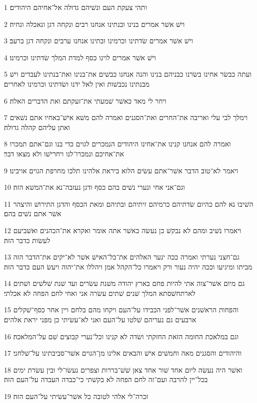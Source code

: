 \par 1 ותהי צעקת העם ונשׁיהם גדולה אל־אחיהם היהודים׃
\par 2 וישׁ אשׁר אמרים בנינו ובנתינו אנחנו רבים ונקחה דגן ונאכלה ונחיה׃
\par 3 וישׁ אשׁר אמרים שׂדתינו וכרמינו ובתינו אנחנו ערבים ונקחה דגן ברעב׃
\par 4 וישׁ אשׁר אמרים לוינו כסף למדת המלך שׂדתינו וכרמינו׃
\par 5 ועתה כבשׂר אחינו בשׂרנו כבניהם בנינו והנה אנחנו כבשׁים את־בנינו ואת־בנתינו לעבדים וישׁ מבנתינו נכבשׁות ואין לאל ידנו ושׂדתינו וכרמינו לאחרים׃
\par 6 ויחר לי מאד כאשׁר שׁמעתי את־זעקתם ואת הדברים האלה׃
\par 7 וימלך לבי עלי ואריבה את־החרים ואת־הסגנים ואמרה להם משׁא אישׁ־באחיו אתם נשׁאים ואתן עליהם קהלה גדולה׃
\par 8 ואמרה להם אנחנו קנינו את־אחינו היהודים הנמכרים לגוים כדי בנו וגם־אתם תמכרו את־אחיכם ונמכרו־לנו ויחרישׁו ולא מצאו דבר׃
\par 9 ויאמר לא־טוב הדבר אשׁר־אתם עשׂים הלוא ביראת אלהינו תלכו מחרפת הגוים אויבינו׃
\par 10 וגם־אני אחי ונערי נשׁים בהם כסף ודגן נעזבה־נא את־המשׁא הזה׃
\par 11 השׁיבו נא להם כהיום שׂדתיהם כרמיהם זיתיהם ובתיהם ומאת הכסף והדגן התירושׁ והיצהר אשׁר אתם נשׁים בהם׃
\par 12 ויאמרו נשׁיב ומהם לא נבקשׁ כן נעשׂה כאשׁר אתה אומר ואקרא את־הכהנים ואשׁביעם לעשׂות כדבר הזה׃
\par 13 גם־חצני נערתי ואמרה ככה ינער האלהים את־כל־האישׁ אשׁר לא־יקים את־הדבר הזה מביתו ומיגיעו וככה יהיה נעור ורק ויאמרו כל־הקהל אמן ויהללו את־יהוה ויעשׂ העם כדבר הזה׃
\par 14 גם מיום אשׁר־צוה אתי להיות פחם בארץ יהודה משׁנת עשׂרים ועד שׁנת שׁלשׁים ושׁתים לארתחשׁסתא המלך שׁנים שׁתים עשׂרה אני ואחי לחם הפחה לא אכלתי׃
\par 15 והפחות הראשׁנים אשׁר־לפני הכבידו על־העם ויקחו מהם בלחם ויין אחר כסף־שׁקלים ארבעים גם נעריהם שׁלטו על־העם ואני לא־עשׂיתי כן מפני יראת אלהים׃
\par 16 וגם במלאכת החומה הזאת החזקתי ושׂדה לא קנינו וכל־נערי קבוצים שׁם על־המלאכה׃
\par 17 והיהודים והסגנים מאה וחמשׁים אישׁ והבאים אלינו מן־הגוים אשׁר־סביבתינו על־שׁלחני׃
\par 18 ואשׁר היה נעשׂה ליום אחד שׁור אחד צאן שׁשׁ־בררות וצפרים נעשׂו־לי ובין עשׂרת ימים בכל־יין להרבה ועם־זה לחם הפחה לא בקשׁתי כי־כבדה העבדה על־העם הזה׃
\par 19 זכרה־לי אלהי לטובה כל אשׁר־עשׂיתי על־העם הזה׃

